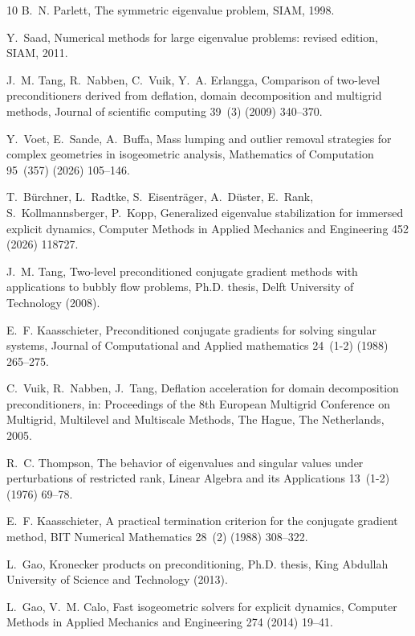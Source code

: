 \documentclass{article}
\numberwithin{equation}{section}
\theoremstyle{definition}
\begin{document}
\begin{thebibliography}{10}
B.~N. Parlett, The symmetric eigenvalue problem, SIAM, 1998.

Y.~Saad, Numerical methods for large eigenvalue problems: revised edition, SIAM, 2011.

J.~M. Tang, R.~Nabben, C.~Vuik, Y.~A. Erlangga, Comparison of two-level preconditioners derived from deflation, domain decomposition and multigrid methods, Journal of scientific computing 39~(3) (2009) 340--370.

Y.~Voet, E.~Sande, A.~Buffa, Mass lumping and outlier removal strategies for complex geometries in isogeometric analysis, Mathematics of Computation 95~(357) (2026) 105--146.

T.~B{\"u}rchner, L.~Radtke, S.~Eisentr{\"a}ger, A.~D{\"u}ster, E.~Rank, S.~Kollmannsberger, P.~Kopp, Generalized eigenvalue stabilization for immersed explicit dynamics, Computer Methods in Applied Mechanics and Engineering 452 (2026) 118727.

J.~M. Tang, Two-level preconditioned conjugate gradient methods with applications to bubbly flow problems, Ph.D. thesis, Delft University of Technology (2008).

E.~F. Kaasschieter, Preconditioned conjugate gradients for solving singular systems, Journal of Computational and Applied mathematics 24~(1-2) (1988) 265--275.

C.~Vuik, R.~Nabben, J.~Tang, Deflation acceleration for domain decomposition preconditioners, in: Proceedings of the 8th European Multigrid Conference on Multigrid, Multilevel and Multiscale Methods, The Hague, The Netherlands, 2005.

R.~C. Thompson, The behavior of eigenvalues and singular values under perturbations of restricted rank, Linear Algebra and its Applications 13~(1-2) (1976) 69--78.

E.~F. Kaasschieter, A practical termination criterion for the conjugate gradient method, BIT Numerical Mathematics 28~(2) (1988) 308--322.

L.~Gao, {Kronecker} products on preconditioning, Ph.D. thesis, King Abdullah University of Science and Technology (2013).

L.~Gao, V.~M. Calo, Fast isogeometric solvers for explicit dynamics, Computer Methods in Applied Mechanics and Engineering 274 (2014) 19--41.


\end{thebibliography}
\end{document}
